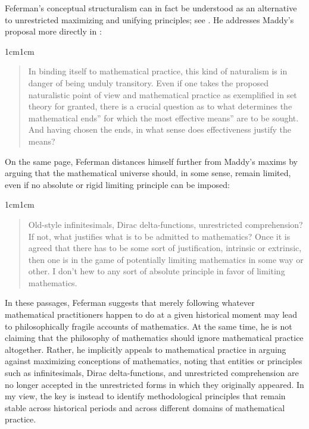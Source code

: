 \documentclass[11pt,a4paper]{article}
\theoremstyle{plain}
\begin{document}
Feferman's conceptual structuralism can in fact be understood as an alternative to unrestricted maximizing and unifying principles; see \parencite[p.~9]{Feferman2011a}. He addresses Maddy's proposal more directly in \textcite[p.~9]{Feferman2000NewAxioms}:

\begin{adjustwidth}{1cm}{1cm}
\small
\begin{quote}
In binding itself to mathematical practice, this kind of naturalism is in danger of being unduly transitory. Even if one takes the proposed naturalistic point of view and mathematical practice as exemplified in set theory for granted, there is a crucial question as to what determines the mathematical ends'' for which the most effective means'' are to be sought. And having chosen the ends, in what sense does effectiveness justify the means?
\end{quote}
\end{adjustwidth}

On the same page, Feferman distances himself further from Maddy’s maxims by arguing that the mathematical universe should, in some sense, remain limited, even if no absolute or rigid limiting principle can be imposed:

\begin{adjustwidth}{1cm}{1cm}
\small
\begin{quote}
Old-style infinitesimals, Dirac delta-functions, unrestricted comprehension? If not, what justifies what is to be admitted to mathematics? Once it is agreed that there has to be some sort of justification, intrinsic or extrinsic, then one is in the game of potentially limiting mathematics in some way or other. I don't hew to any sort of absolute principle in favor of limiting mathematics.
\end{quote}
\end{adjustwidth}

In these passages, Feferman suggests that merely following whatever mathematical practitioners happen to do at a given historical moment may lead to philosophically fragile accounts of mathematics. At the same time, he is not claiming that the philosophy of mathematics should ignore mathematical practice altogether. Rather, he implicitly appeals to mathematical practice in arguing against maximizing conceptions of mathematics, noting that entities or principles such as infinitesimals, Dirac delta-functions, and unrestricted comprehension are no longer accepted in the unrestricted forms in which they originally appeared. In my view, the key is instead to identify methodological principles that remain stable across historical periods and across different domains of mathematical practice.
\end{document}
